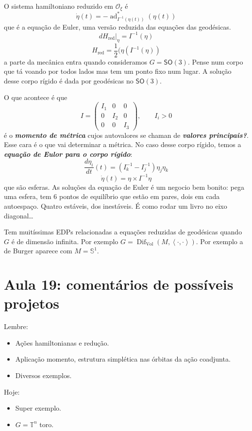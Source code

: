 O sistema hamiltoniano reduzido em $\mathcal{O}_\xi$ é
\[\dot \eta(t)=-\operatorname{ad}^*_{I^{-1}(\eta(t))}(\eta(t))\]
que é a equação de Euler, uma versão reduzida das equações das geodésicas.
\[dH_{\operatorname{red}}|_{\eta}=I^{-1}(\eta)\]
\[H_{\operatorname{red}}=\frac{1}{2}(\eta(I^{-1}(\eta))\]
a parte da mecânica entra quando consideramos $G=\mathsf{SO}(3)$. Pense num corpo que tá voando por todos lados mas tem um ponto fixo num lugar. A solução desse corpo rígido é dada por geodésicas no $\mathsf{SO}(3)$.

O que acontece é que
\[I=\begin{pmatrix} I_1&0&0\\0&I_2&0\\0&0&I_3 \end{pmatrix} ,\qquad I_i>0\]
é o \textit{\textbf{momento de métrica}} cujos autovalores se chaman de \textit{\textbf{valores principais?}}. Esse cara  é o que vai determinar a métrica. No caso desse corpo rígido, temos a \textit{\textbf{equação de Eulor para o corpo rígido}}:
\[\frac{d\eta_i}{dt}(t)=(I_k^{-1}-I_j^{-1})\eta_j\eta_k\]
\[\dot \eta(t)=\eta\times I^{-1}\eta\]
que são esferas. As soluções da equação de Euler é um negocio bem bonito: pega uma esfera, tem 6 pontos de equilíbrio que estão em pares, dois em cada autoespaço. Quatro estáveis, dos inestáveis. {\color{4}É como rodar um livro no eixo diagonal…}

\begin{remark}\leavevmode
	Tem muitíssimas EDPs relacionadas a equações  reduzidas de geodésicas quando $G$ é de dimensão infinita. Por exemplo $G=\operatorname{Dif}_{\operatorname{Vol}}(M,\left<\cdot,\cdot\right> )$. Por exemplo a de Burger aparece com $M=\mathbb{S}^1$.
\end{remark}

\section{Aula 19: comentários de possíveis projetos}

Lembre:
\begin{itemize}
\item Ações hamiltonianas e redução.
\item Aplicação momento, estrutura simplética nas órbitas da ação coadjunta.
\item Diversos exemplos.
\end{itemize}

Hoje:
\begin{itemize}
\item Super exemplo.
\item $G=\mathbb{T}^n$ toro.
\end{itemize}

